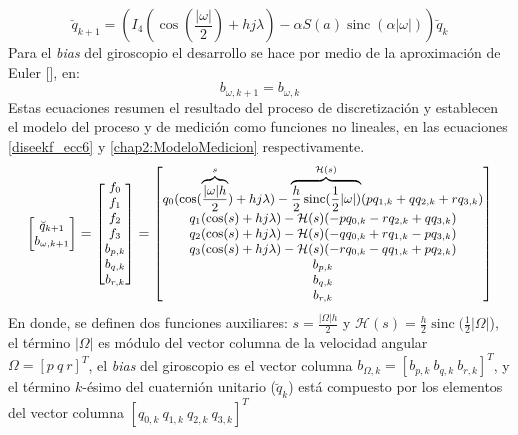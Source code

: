 \documentclass[10pt]{report}
\numberwithin{equation}{chapter}
\numberwithin{algorithm}{chapter}
\DeclareMathOperator{\sinc}{sinc}
\newcommand{\bias}{\emph{bias} }
\begin{document}
\begin{equation}\label{diseekf_ecc4}
\breve{q}_{k+1}=\left(I_4(\cos(\frac{|\omega|}{2})+hj\lambda)-\alpha S(a)\sinc (\alpha |\omega|)\right)\breve{q}_k
\end{equation}
Para el \emph{bias} del giroscopio el desarrollo se hace por medio de la aproximación de Euler [\cite{Stewart2006}], en:
\begin{equation}\label{diseekf_ecc5}
b_{\omega,k+1}=b_{\omega,k}
\end{equation}
Estas ecuaciones resumen el resultado del proceso de discretización y establecen el modelo del proceso y de medición como funciones no lineales, en las ecuaciones \eqref{diseekf_ecc6} y \eqref{chap2:ModeloMedicion} respectivamente.
\begin{equation}\label{diseekf_ecc6}\small{
\begin{bmatrix}\breve{q}_{k+1}\\b_{\omega,k+1}\end{bmatrix}=
\begin{bmatrix}f_0\\f_1\\f_2\\f_3\\b_{p,k}\\b_{q,k}\\b_{r,k}\end{bmatrix}=
\begin{bmatrix}q_0(\cos(\overbrace{\frac{|\omega|h}{2}}^s)+hj\lambda)-\overbrace{\frac{h}{2}\sinc (\frac{1}{2} |\omega|)}^{\mathcal{H}(s)}(pq_{1,k}+qq_{2,k}+rq_{3,k})\\q_1(\cos(s)+hj\lambda)-\mathcal{H}(s) (-pq_{0,k}-rq_{2,k}+qq_{3,k})\\q_2(\cos(s)+hj\lambda)-\mathcal{H}(s) (-qq_{0,k}+rq_{1,k}-pq_{3,k})\\q_3(\cos(s)+hj\lambda)-\mathcal{H}(s) (-rq_{0,k}-qq_{1,k}+pq_{2,k})\\b_{p,k}\\b_{q,k}\\b_{r,k}\end{bmatrix}}
\end{equation}
En donde, se definen dos funciones auxiliares: $s=\frac{|\Omega| h}{2}$ y $\mathcal{H}(s)=\frac{h}{2}\sinc (\frac{1}{2} |\Omega|$), el término $|\Omega|$ es módulo del vector columna de la velocidad angular $\Omega=[p~q~r]^T$, el \bias del giroscopio es el vector columna $b_{\Omega,k}=[b_{p,k}~b_{q,k}~b_{r,k}]^T$, y el término $k$-ésimo del cuaternión unitario ($\breve{q}_k$) está compuesto por los elementos del vector columna $[q_{0,k}~q_{1,k}~q_{2,k}~q_{3,k}]^T$\par
\end{document}
